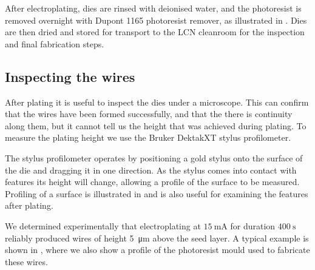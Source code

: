 After electroplating, dies are rinsed with deionised water, and the photoresist
is removed overnight with Dupont 1165 photoresist remover, as illustrated
in . Dies are then
dried and stored for transport to the LCN cleanroom for the inspection and
final fabrication steps.


\subsection{Inspecting the wires}
\label{fab:inspwire}

After plating it is useful to inspect the dies under a microscope. This can
confirm that the wires have been formed successfully, and that the there
is continuity along them, but it cannot tell us the height that was achieved
during plating. To measure the plating height we use 
the Bruker DektakXT stylus profilometer.

The stylus profilometer operates by positioning a gold stylus onto the surface of
the die and dragging it in one direction. As the stylus comes into contact with
features its height will change, allowing a profile of the surface to be
measured. Profiling of a surface is illustrated in 
and is also useful for examining the features after plating.

We determined experimentally that electroplating at $\SI{15}{\milli\ampere}$
for duration $\SI{400}{\second}$ reliably produced wires of height
\SI{5}{\micro\meter} above the seed layer. A typical example is shown in
, where we also show a profile of the photoresist
mould used to fabricate these wires.

